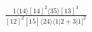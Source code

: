 \documentclass[varwidth, border=5pt]{standalone}
\begin{document}
\begin{my}
$\begin{gathered}
\scriptscriptstyle\frac{1⟨14⟩[14]^2⟨35⟩[13]^3}{[12]^2[15]⟨24⟩⟨1|2+3|1]^2}
\end{gathered}$
\end{my}
\end{document}
